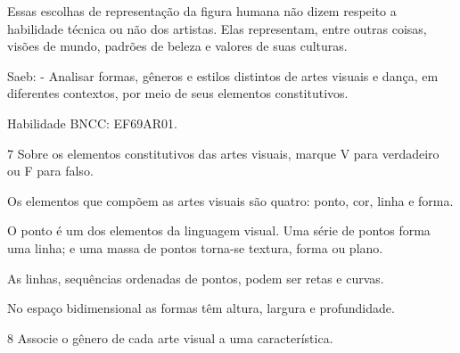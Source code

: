 \begin{escolha}
{Essas escolhas de representação da figura humana não dizem respeito a
habilidade técnica ou não dos artistas. Elas representam, entre outras
coisas, visões de mundo, padrões de beleza e valores de suas culturas.

Saeb: - Analisar formas, gêneros e estilos distintos de artes visuais e
dança, em diferentes contextos, por meio de seus elementos
constitutivos.

Habilidade BNCC: EF69AR01.}

\num{7} Sobre os elementos constitutivos das artes visuais, marque V para
verdadeiro ou F para falso.

\begin{boxlist}
\item Os elementos que compõem as artes visuais são quatro: ponto, cor, linha e forma. 

\item O ponto é um dos elementos da linguagem visual. Uma série de pontos forma uma linha; e uma massa de pontos torna-se textura, forma ou plano. 

\item As linhas, sequências ordenadas de pontos, podem ser retas e curvas. 

\item No espaço bidimensional as formas têm altura, largura e profundidade. 
\end{boxlist}


\num{8} Associe o gênero de cada arte visual a uma característica.

\begin{boxlist}






\end{boxlist}
\end{escolha}
